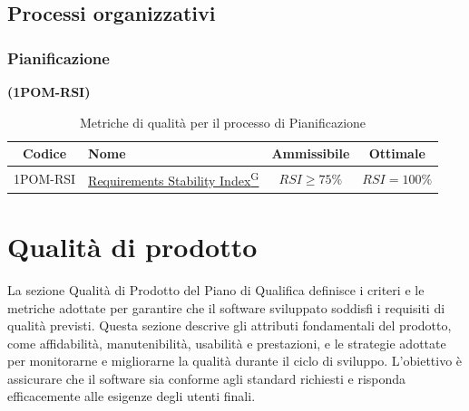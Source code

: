 \documentclass{article}
\begin{document}
\subsection{Processi organizzativi}
\subsubsection{Pianificazione} %
\textbf{(1POM-RSI)}
\begin{table}[H]
    \centering
    \renewcommand{\arraystretch}{1.5} %
    \begin{tabular}{|c|l|c|c|}
        \hline
        \textbf{Codice} & \textbf{Nome} & \textbf{Ammissibile} & \textbf{Ottimale} \\
        \hline
        1POM-RSI & \href{https://code7crusaders.github.io/docs/RTB/documentazione_interna/glossario.html#requirements-stability-index}{Requirements Stability Index\textsuperscript{G}} & $RSI \geq 75\%$ & $RSI = 100\%$ \\
        \hline
    \end{tabular}
    \label{tab:pianificazione}
    \caption{Metriche di qualità per il processo di Pianificazione}
\end{table}
\newpage

\section{Qualità di prodotto}
La sezione Qualità di Prodotto del Piano di Qualifica definisce i criteri e le metriche adottate per garantire che il software sviluppato soddisfi i requisiti di qualità previsti. Questa sezione descrive gli attributi fondamentali del prodotto, come affidabilità, manutenibilità, usabilità e prestazioni, e le strategie adottate per monitorarne e migliorarne la qualità durante il ciclo di sviluppo. L'obiettivo è assicurare che il software sia conforme agli standard richiesti e risponda efficacemente alle esigenze degli utenti finali.
    
\end{document}
